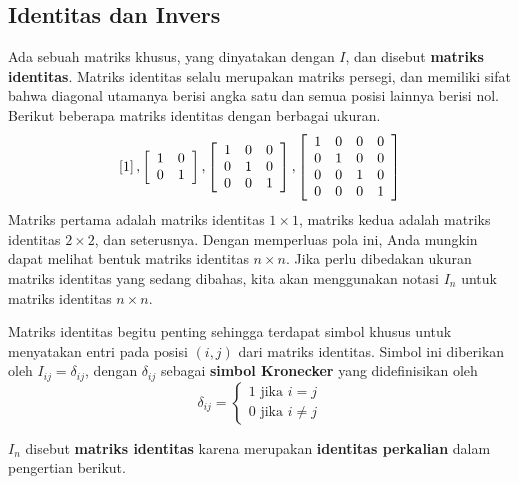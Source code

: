 \subsection{Identitas dan Invers}

Ada sebuah matriks khusus, yang dinyatakan dengan $I$, dan disebut
 \textbf{matriks identitas}. Matriks identitas selalu merupakan matriks
persegi, dan memiliki
sifat bahwa diagonal utamanya berisi angka satu dan semua posisi lainnya
berisi nol. Berikut beberapa matriks identitas dengan berbagai ukuran.
\begin{equation*}
\left[ 1\right] ,\left[
\begin{array}{cc}
1 & 0 \\
0 & 1
\end{array}
\right] ,\left[
\begin{array}{ccc}
1 & 0 & 0 \\
0 & 1 & 0 \\
0 & 0 & 1
\end{array}
\right] ,\left[
\begin{array}{cccc}
1 & 0 & 0 & 0 \\
0 & 1 & 0 & 0 \\
0 & 0 & 1 & 0 \\
0 & 0 & 0 & 1
\end{array}
\right] 
\end{equation*}
Matriks pertama adalah matriks identitas $1\times 1$, matriks kedua adalah matriks identitas $2\times 2$,
dan seterusnya. Dengan memperluas pola ini, Anda mungkin dapat melihat
bentuk matriks identitas $n\times n$. Jika perlu dibedakan
ukuran matriks identitas yang sedang dibahas, kita akan menggunakan
notasi $I_n$ untuk matriks identitas $n \times n$. 

Matriks identitas begitu penting sehingga terdapat
simbol khusus untuk menyatakan entri pada posisi $(i,j)$ dari matriks identitas. Simbol ini diberikan oleh
$I_{ij}=\delta _{ij}$, dengan $\delta _{ij}$ sebagai \textbf{simbol Kronecker}
yang didefinisikan
 oleh
\begin{equation*}
\delta _{ij}=\left\{
\begin{array}{c}
1
\text{ jika }i=j \\
0\text{ jika }i\neq j
\end{array}
\right.
\end{equation*}

$I_n$ disebut \textbf{matriks identitas} karena merupakan \textbf{identitas perkalian} dalam pengertian berikut.

